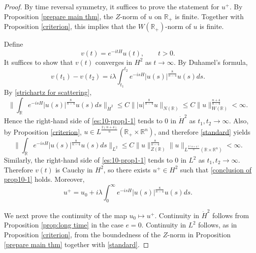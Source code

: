 \documentclass[11pt,a4paper]{article}
\numberwithin{equation}{section}
\begin{document}
\begin{proof}
By time reversal symmetry, it suffices to prove the statement for $u^{+}$.
By Proposition \ref{prepare main thm}, the $Z$-norm of $u$ on $\mathbb{R}_{+}$ is finite. Together with Proposition \ref{criterion}, this implies that the $W(\mathbb{R}_{+})$-norm of $u$ is finite.

Define
\[
v(t) = e^{-itH}u(t), \qquad t > 0.
\]
It suffices to show that $v(t)$ converges in $H^{2}$ as $t \to \infty$.
By Duhamel's formula,
\begin{equation}\label{es:10-prop1-1}
v(t_{1}) - v(t_{2}) = i\lambda \int_{t_{1}}^{t_{2}} e^{-isH}|u(s)|^{\frac{8}{n-4}}u(s)ds.
\end{equation}
By \eqref{strichartz for scattering},
\[
 \| \int_{\mathbb{R}}e^{-isH}|u(s)|^{\frac{8}{n-4}}u(s)ds \|_{\dot{H}^{2}}
 \leq C\||u|^{\frac{8}{n-4}}u \|_{N(\mathbb{R})}
 \leq C\|u\|^{\frac{n+4}{n-4}}_{W(\mathbb{R})} < \infty.
\]
Hence the right-hand side of \eqref{es:10-prop1-1} tends to $0$ in $\dot{H}^{2}$ as $t_{1}, t_{2} \to \infty$.
Also, by Proposition \ref{criterion}, $u\in L^{\frac{2(n+4)}{n}}(\mathbb{R}_{+}\times\mathbb{R}^{n})$, and therefore \eqref{standard} yields
\[
 \| \int_{\mathbb{R}}e^{-isH}|u(s)|^{\frac{8}{n-4}}u(s)ds \|_{L^{2}}
 \leq C\|u\|_{Z(\mathbb{R})}^{\frac{8}{n-4}}\|u\|_{L^{\frac{2(n+4)}{n}}(\mathbb{R}\times\mathbb{R}^{n})} < \infty.
\]
Similarly, the right-hand side of \eqref{es:10-prop1-1} tends to $0$ in $L^{2}$ as $t_{1}, t_{2}\to\infty$.
Therefore $v(t)$ is Cauchy in $H^{2}$, so there exists $u^{+} \in H^{2}$ such that \eqref{conclusion of prop10-1} holds.
Moreover,
\[
 u^{+}  = u_{0} + i\lambda \int_{0}^{\infty} e^{-isH}|u(s)|^{\frac{8}{n-4}}u(s)ds.
\]

We next prove the continuity of the map $u_{0} \mapsto u^{+}$. Continuity in $\dot{H}^{2}$ follows from Proposition \ref{prop:long time} in the case $e=0$. Continuity in $L^{2}$ follows, as in Proposition \ref{criterion}, from the boundedness of the $Z$-norm in Proposition \ref{prepare main thm} together with \eqref{standard}.


\end{proof}
\end{document}

